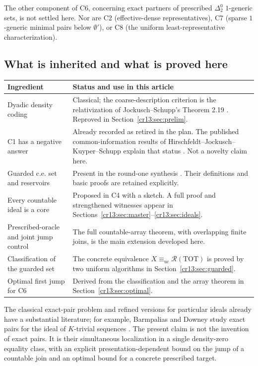 \documentclass[11pt,letterpaper]{article}
\theoremstyle{definition}
\theoremstyle{remark}\newtheorem{remark}[theorem]{Remark}
\numberwithin{equation}{section}
\newcommand{\equc}{\equiv_{\mathrm{uc}}}
\newcommand{\TOT}{\mathrm{TOT}}
\newcommand{\Rc}{\mathcal R}
\begin{document}
The other component of C6, concerning exact partners of prescribed $\Delta^0_2$ $1$-generic sets, is not settled here. Nor are C2 (effective-dense representatives), C7 (sparse $1$-generic minimal pairs below $\emptyset'$), or C8 (the uniform least-representative characterization).

\subsection{What is inherited and what is proved here}
\begin{center}\small
\begin{tabularx}{\textwidth}{@{}>{\raggedright\arraybackslash}p{}X@{}}
\toprule
Ingredient & Status and use in this article\\\midrule
Dyadic density coding & Classical; the coarse-description criterion is the relativization of Jockusch--Schupp's Theorem 2.19 \cite{JS}. Reproved in Section~\ref{cr13:sec:prelim}.\\
C1 has a negative answer & Already recorded as retired in the plan. The published common-information results of Hirschfeldt--Jockusch--Kuyper--Schupp explain that status \cite{HJKS,Plan}. Not a novelty claim here.\\
Guarded c.e. set and reservoirs & Present in the round-one synthesis \cite{Synthesis}. Their definitions and basic proofs are retained explicitly.\\
Every countable ideal is a core & Proposed in C4 with a sketch. A full proof and strengthened witnesses appear in Sections~\ref{cr13:sec:master}--\ref{cr13:sec:ideals}.\\
Prescribed-oracle and joint jump control & The full countable-array theorem, with overlapping finite joins, is the main extension developed here.\\
Classification of the guarded set & The concrete equivalence $X\equc\Rc(\TOT)$ is proved by two uniform algorithms in Section~\ref{cr13:sec:guarded}.\\
Optimal first jump for C6 & Derived from the classification and the array theorem in Section~\ref{cr13:sec:optimal}.\\\bottomrule
\end{tabularx}
\end{center}

The classical exact-pair problem and refined versions for particular ideals already have a substantial literature; for example, Barmpalias and Downey study exact pairs for the ideal of $K$-trivial sequences \cite{BD}. The present claim is not the invention of exact pairs. It is their simultaneous localization in a single density-zero equality class, with an explicit presentation-dependent bound on the jump of a countable join and an optimal bound for a concrete prescribed target.
\end{document}
